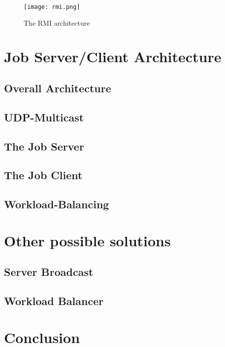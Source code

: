 \begin{figure}[H]
	\centering
	\texttt{[image: rmi.png]}
	\caption[Caption for LOF]{The RMI architecture\footnotemark}
	\label{rmi}
\end{figure}

\chapter{Job Server/Client Architecture}
\label{job}
\section{Overall Architecture}
\section{UDP-Multicast}
\section{The Job Server}
\section{The Job Client}
\section{Workload-Balancing}
\chapter{Other possible solutions}
\label{other-solutions}
\section{Server Broadcast}
\section{Workload Balancer}

\chapter{Conclusion}
\label{conclusion}
